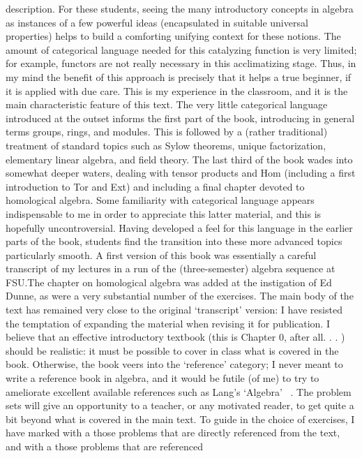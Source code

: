 description. For these students, seeing the many introductory concepts
in algebra as instances of a few powerful ideas (encapsulated in
suitable universal properties) helps to build a comforting unifying
context for these notions. The amount of categorical language needed
for this catalyzing function is very limited; for example, functors
are not really necessary in this acclimatizing stage.  Thus, in my
mind the benefit of this approach is precisely that it helps a true
beginner, if it is applied with due care. This is my experience in the
classroom, and it is the main characteristic feature of this text. The
very little categorical language introduced at the outset informs the
first part of the book, introducing in general terms groups, rings,
and modules. This is followed by a (rather traditional) treatment of
standard topics such as Sylow theorems, unique factorization,
elementary linear algebra, and field theory. The last third of the
book wades into somewhat deeper waters, dealing with tensor products
and Hom (including a first introduction to Tor and Ext) and including
a final chapter devoted to homological algebra. Some familiarity with
categorical language appears indispensable to me in order to
appreciate this latter material, and this is hopefully
uncontroversial.  Having developed a feel for this language in the
earlier parts of the book, students find the transition into these
more advanced topics particularly smooth.  A first version of this
book was essentially a careful transcript of my lectures in a run of
the (three-semester) algebra sequence at FSU.\@ The chapter on
homological algebra was added at the instigation of Ed Dunne, as were
a very substantial number of the exercises. The main body of the text
has remained very close to the original `transcript' version: I have
resisted the temptation of expanding the material when revising it for
publication. I believe that an effective introductory textbook (this
is Chapter 0, after all. . . ) should be realistic: it must be
possible to cover in class what is covered in the book. Otherwise, the
book veers into the `reference' category; I never meant to write a
reference book in algebra, and it would be futile (of me) to try to
ameliorate excellent available references such as Lang's `Algebra'~%
\cite{Lang2002Algebra}.  The problem sets will give an opportunity to
a teacher, or any motivated reader, to get quite a bit beyond what is
covered in the main text. To guide in the choice of exercises, I have
marked with a \exerused{} those problems that are directly referenced
from the text, and with a \lnot{} those problems that are referenced
